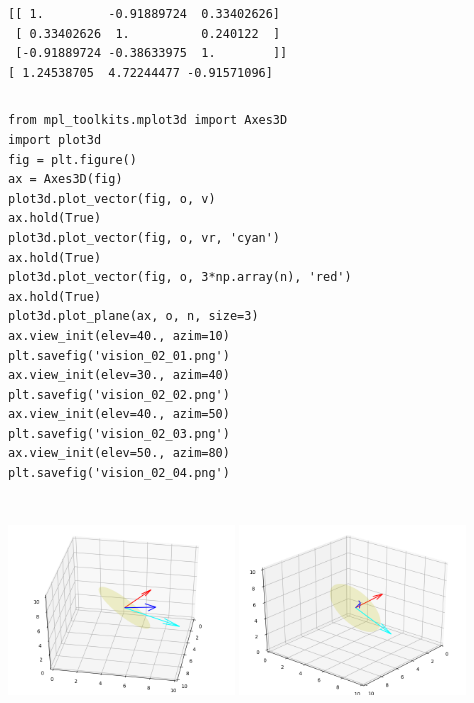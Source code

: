 \documentclass[12pt,fleqn]{article}\usepackage{../../common}
\begin{document}
\begin{verbatim}
[[ 1.         -0.91889724  0.33402626]
 [ 0.33402626  1.          0.240122  ]
 [-0.91889724 -0.38633975  1.        ]]
[ 1.24538705  4.72244477 -0.91571096]
\end{verbatim}

\inputminted[fontsize=\footnotesize]{python}{plot3d.py}

\begin{verbatim}
from mpl_toolkits.mplot3d import Axes3D
import plot3d
fig = plt.figure()
ax = Axes3D(fig)
plot3d.plot_vector(fig, o, v)
ax.hold(True)
plot3d.plot_vector(fig, o, vr, 'cyan')
ax.hold(True)
plot3d.plot_vector(fig, o, 3*np.array(n), 'red')
ax.hold(True)
plot3d.plot_plane(ax, o, n, size=3)
ax.view_init(elev=40., azim=10)
plt.savefig('vision_02_01.png')
ax.view_init(elev=30., azim=40)
plt.savefig('vision_02_02.png')
ax.view_init(elev=40., azim=50)
plt.savefig('vision_02_03.png')
ax.view_init(elev=50., azim=80)
plt.savefig('vision_02_04.png')
\end{verbatim}

\includegraphics[height=6cm,width=6cm]{vision_02_01.png}
\includegraphics[height=6cm,width=6cm]{vision_02_02.png}
\end{document}
